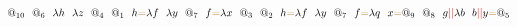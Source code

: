 \documentclass[a4paper, 10pt]{article}
\newcommand{\tikzmark}[3][]{\tikz[remember picture,baseline] \node [inner xsep=0pt,anchor=base,#1](#2) {#3};}
\begin{document}
\[\tikzmark{1}{$@_{10}$}\ \ \tikzmark{2}{$@_6$}\ \ \tikzmark{3}{$\lambda h$}\ \ \tikzmark{4}{$\lambda z$}\ \ \tikzmark{5}{$@_4$}\ \ \tikzmark{6}{$@_1$}\ \ \tikzmark{7}{$h$}\tikzmark{}{\color{brown}{=}}\tikzmark{8}{$\lambda f$}\ \ \tikzmark{9}{$\lambda y$}\ \ \tikzmark{10}{$@_7$}\ \ \tikzmark{11}{$f$}\tikzmark{}{\color{brown}{=}}\tikzmark{12}{$\lambda x$}\ \ \tikzmark{13}{$@_3$}\ \ \tikzmark{14}{$@_2$}\ \ \tikzmark{15}{$h$}\tikzmark{}{\color{brown}{=}}\tikzmark{16}{$\lambda f$}\ \ \tikzmark{17}{$\lambda y$}\ \ \tikzmark{18}{$@_7$}\ \ \tikzmark{19}{$f$}\tikzmark{}{\color{brown}{=}}\tikzmark{20}{$\lambda q$}\ \ \tikzmark{21}{$x$}\tikzmark{}{\color{brown}{=}}\tikzmark{22}{$@_9$}\ \ \tikzmark{23}{$@_8$}\ \ \tikzmark{24}{$g$}\tikzmark{}{\color{red}{||}}\tikzmark{25}{$\lambda b$}\ \ \tikzmark{26}{$b$}\tikzmark{}{\color{red}{||}}\tikzmark{27}{$y$}\tikzmark{}{\color{brown}{=}}\tikzmark{29}{$@_5$}\]
\end{document}

